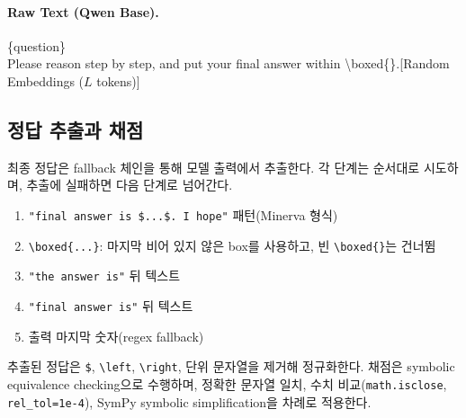 \paragraph{Raw Text (Qwen Base).}
\begin{tcolorbox}[colback=gray!5, colframe=black!60, arc=3pt, boxrule=0.5pt, fontupper=\footnotesize\ttfamily, breakable]
\{question\}\\
Please reason step by step, and put your final answer within \textbackslash boxed\{\}.\textcolor{blue!70!black}{[Random Embeddings ($L$ tokens)]}
\end{tcolorbox}

\subsection{정답 추출과 채점}\label{app:extraction}

최종 정답은 fallback 체인을 통해 모델 출력에서 추출한다. 각 단계는 순서대로 시도하며, 추출에 실패하면 다음 단계로 넘어간다.

\begin{tcolorbox}[colback=gray!5, colframe=black!60, arc=3pt, boxrule=0.5pt, title=\textbf{정답 추출 fallback 체인}, fonttitle=\small, coltitle=black, colbacktitle=gray!20]
\small
\begin{enumerate}[leftmargin=*, nosep]
  \item \texttt{"final answer is \$...\$. I hope"} 패턴(Minerva 형식)
  \item \texttt{\textbackslash boxed\{...\}}: 마지막 비어 있지 않은 box를 사용하고, 빈 \texttt{\textbackslash boxed\{\}}는 건너뜀
  \item \texttt{"the answer is"} 뒤 텍스트
  \item \texttt{"final answer is"} 뒤 텍스트
  \item 출력 마지막 숫자(regex fallback)
\end{enumerate}
\end{tcolorbox}

\vspace{0.5em}
추출된 정답은 \texttt{\$}, \texttt{\textbackslash left}, \texttt{\textbackslash right}, 단위 문자열을 제거해 정규화한다. 채점은 symbolic equivalence checking으로 수행하며, 정확한 문자열 일치, 수치 비교(\texttt{math.isclose}, \texttt{rel\_tol=1e-4}), SymPy symbolic simplification을 차례로 적용한다.

